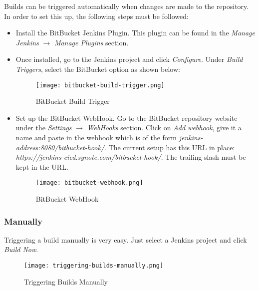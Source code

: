 Builds can be triggered automatically when changes are made to the repository. In order to set this up, the following steps must be followed:

\begin{itemize}
\item Install the BitBucket Jenkins Plugin. This plugin can be found in the \textit{Manage Jenkins} $\rightarrow$ \textit{Manage Plugins} section.

\item Once installed, go to the Jenkins project and click \textit{Configure}. Under \textit{Build Triggers}, select the BitBucket option as shown below:

\begin{figure}[!hbt]
  	\centering
 	\texttt{[image: bitbucket-build-trigger.png]}
  	\caption{BitBucket Build Trigger}
 	\label{fig:bitbucket-build-trigger}
\end{figure}

\item Set up the BitBucket WebHook. Go to the BitBucket repository website under the \textit{Settings} $\rightarrow$ \textit{WebHooks} section. Click on \textit{Add webhook}, give it a name and paste in the webhook which is of the form \textit{jenkins-address:8080/bitbucket-hook/}. The current setup has this URL in place: \textit{https://jenkins-cicd.synote.com/bitbucket-hook/}. The trailing slash must be kept in the URL.

\begin{figure}[!hbt]
  	\centering
 	\texttt{[image: bitbucket-webhook.png]}
  	\caption{BitBucket WebHook}
 	\label{fig:bitbucket-webhook}
\end{figure}

\end{itemize}

\subsubsection{Manually}
\label{subsubsec:triggering-builds-manually}

Triggering a build manually is very easy. Just select a Jenkins project and click \textit{Build Now}.

\begin{figure}[!hbt]
  	\centering
 	\texttt{[image: triggering-builds-manually.png]}
  	\caption{Triggering Builds Manually}
 	\label{fig:triggering-builds-manually}
\end{figure}

